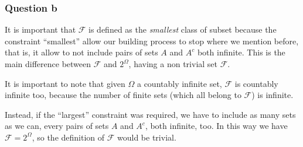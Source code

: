 \documentclass[twoside,openright,titlepage,fleqn,
	headinclude,11pt,a4paper,BCOR5mm,footinclude
	]{scrbook}
\begin{document}


\subsubsection{Question b}
It is important that $\mathcal{F}$ is defined as the \emph{smallest}
class of subset because the constraint ``smallest'' allow our building
process to stop where we mention before, that is, it allow to not
include pairs of sets $A$ and $A^c$ both infinite. This is the main
difference between $\mathcal{F}$ and $2^\Omega$, having a non trivial
set $\mathcal{F}$.

It is important to note that given $\Omega$ a countably infinite set,
$\mathcal{F}$ is countably infinite too, because the number of finite
sets (which all belong to $\mathcal{F}$) is infinite.

Instead, if the ``largest'' constraint was required, we have to
include as many sets as we can, every pairs of sets $A$ and $A^c$,
both infinite, too. In this way we have $\mathcal{F} = 2^\Omega$, so
the definition of $\mathcal{F}$ would be trivial.
\end{document}
